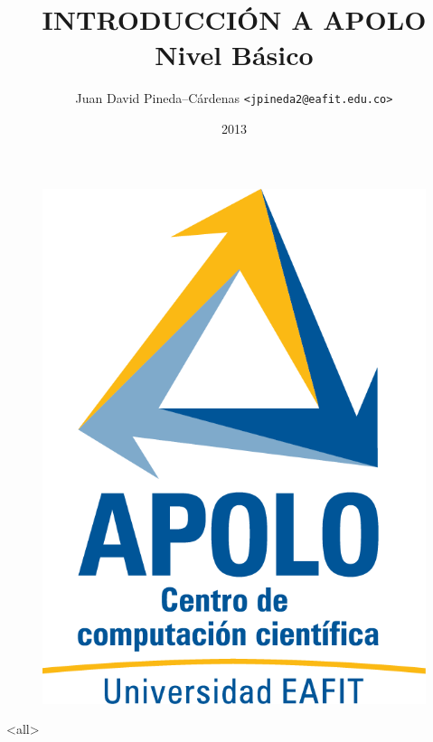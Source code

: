 \documentclass[ignorenonframetext]{beamer}
\title[Apolos Básico]{INTRODUCCIÓN A APOLO \newline Nivel Básico}
\author[]{Juan David Pineda--Cárdenas \texttt{<jpineda2@eafit.edu.co>}
}
\institute[Universidad EAFIT]{
  \large Centro de Computación Científica Apolo
}
\date[Universidad EAFIT]{2013}
\begin{document}
\begin{frame}
 \begin{figure}[htp]
	\centering
	\includegraphics[scale=0.5]{imgs/Logo-Apolo-color-transp.png}
\end{figure}
\end{frame}

\begin{frame}
  \titlepage
\end{frame}


\mode<all>

\mode*

 
 
\end{document}
